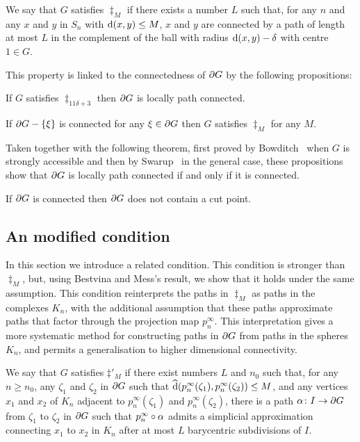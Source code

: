 \documentclass[a4paper]{article}
\begin{document}
\begin{definition}
  We say that $G$ satisfies $\ddag_M$ if there exists a number $L$ such that,
  for any $n$ and any $x$ and $y$ in $S_n$ with $\operatorname{d}(x,y) \leq M$, $x$ and
  $y$ are connected by a path of length at most $L$ in the complement of the
  ball with radius $\operatorname{d}(x,y) - \delta$ with centre $1 \in G$.
\end{definition}

This property is linked to the connectedness of $\partial G$ by the following
propositions:

\begin{proposition}\cite[Proposition 3.2]{bestvinamess91}
  If $G$ satisfies $\ddag_{11\delta + 3}$ then $\partial G$ is locally path
  connected.
\end{proposition}

\begin{proposition}
  If $\partial G - \left\{\xi\right\}$ is connected for any $\xi \in \partial G$ then
  $G$ satisfies $\ddag_M$ for any $M$.
\end{proposition}

Taken together with the following theorem, first proved by
Bowditch~\cite{bowditch98b} when $G$ is strongly accessible and then by
Swarup~\cite{swarup96} in the general case, these propositions show that
$\partial G$ is locally path connected if and only if it is connected.

\begin{theorem}\cite{bowditch98b,swarup96}
  If $\partial G$ is connected then $\partial G$ does not contain a cut
  point.
\end{theorem}

\subsection{An modified condition}

In this section we introduce a related condition. This condition is stronger
than $\ddag_M$, but, using Bestvina and Mess's result, we show that it holds
under the same assumption. This condition reinterprets the paths in $\ddag_M$
as paths in the complexes $K_n$, with the additional assumption that these
paths approximate paths that factor through the projection map $p^\infty_n$.
This interpretation gives a more systematic method for constructing paths in
$\partial G$ from paths in the spheres $K_n$, and permits a generalisation to
higher dimensional connectivity.

\begin{definition}
  We say that $G$ satisfies $\ddag'_M$ if there exist numbers $L$ and $n_0$ such that,
  for any $n \geq n_0$, any $\zeta_1$ and $\zeta_2$ in $\partial G$
  such that $\operatorname{\widehat{d}}(p^\infty_n(\zeta_1), p^\infty_n(\zeta_2)) \leq M$, and
  any vertices $x_1$ and $x_2$ of $K_n$ adjacent to $p^\infty_n(\zeta_1)$ and
  $p^\infty_n(\zeta_2)$, there is a path $\alpha\colon I\to \partial G$ from
  $\zeta_1$ to $\zeta_2$ in $\partial G$ such that $p^\infty_n\circ\alpha$
  admits a simplicial approximation connecting $x_1$ to $x_2$ in $K_n$ after at
  most $L$ barycentric subdivisions of $I$.
\end{definition}
\end{document}
